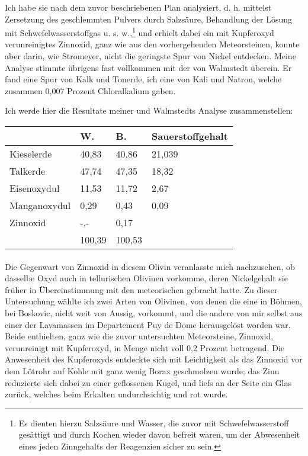 \documentclass[a4paper, 11pt, oneside]{article}
\begin{document}
Ich habe sie nach dem zuvor beschriebenen Plan analysiert, d. h. mittelst Zersetzung des geschlemmten Pulvers durch Salzsäure, Behandlung der Lösung mit Schwefelwasserstoffgas u. s. w.,\footnote{Es dienten hierzu Salzsäure und Wasser, die zuvor mit Schwefelwasserstoff gesättigt und durch Kochen wieder davon befreit waren, um der Abwesenheit eines jeden Zinngehalts der Reagenzien sicher zu sein.} und erhielt dabei ein mit Kupferoxyd verunreinigtes Zinnoxid, ganz wie aus den vorhergehenden Meteorsteinen, konnte aber darin, wie Stromeyer, nicht die geringste Spur von Nickel entdecken. Meine Analyse stimmte übrigens fast vollkommen mit der von Walmstedt überein. Er fand eine Spur von Kalk und Tonerde, ich eine von Kali und Natron, welche zusammen 0,007 Prozent Chloralkalium gaben.

Ich werde hier die Resultate meiner und Walmstedts Analyse zusammenstellen:
\begin{center}
\begin{tabular}{ |p{30mm}|p{20mm}|p{20mm}|p{26mm}| }
    \hline
      & W. & B. & Sauerstoffgehalt\\\hline
      Kieselerde & 40,83 & 40,86 & 21,039\\\hline
      Talkerde & 47,74 & 47,35 & 18,32\\\hline
      Eisenoxydul & 11,53 & 11,72 & 2,67\\\hline
      Manganoxydul & 0,29 & 0,43 & 0,09\\\hline
      Zinnoxid & -,- & 0,17  & \\\hline
       & 100,39 & 100,53 & \\
    \hline
\end{tabular}
\end{center}
\paragraph{}
Die Gegenwart von Zinnoxid in diesem Olivin veranlasste mich nachzusehen, ob dasselbe Oxyd auch in tellurischen Olivinen vorkomme, deren Nickelgehalt sie früher in Übereinstimmung mit den meteorischen gebracht hatte. Zu dieser Untersuchung wählte ich zwei Arten von Olivinen, von denen die eine in Böhmen, bei Boskovic, nicht weit von Aussig, vorkommt, und die andere von mir selbst aus einer der Lavamassen im Departement Puy de Dome herausgelöst worden war. Beide enthielten, ganz wie die zuvor untersuchten Meteorsteine, Zinnoxid, verunreinigt mit Kupferoxyd, in Menge nicht voll 0,2 Prozent betragend. Die Anwesenheit des Kupferoxyds entdeckte sich mit Leichtigkeit als das Zinnoxid vor dem Lötrohr auf Kohle mit ganz wenig Borax geschmolzen wurde; das Zinn reduzierte sich dabei zu einer geflossenen Kugel, und liefs an der Seite ein Glas zurück, welches beim Erkalten undurchsichtig und rot wurde.
\end{document}

